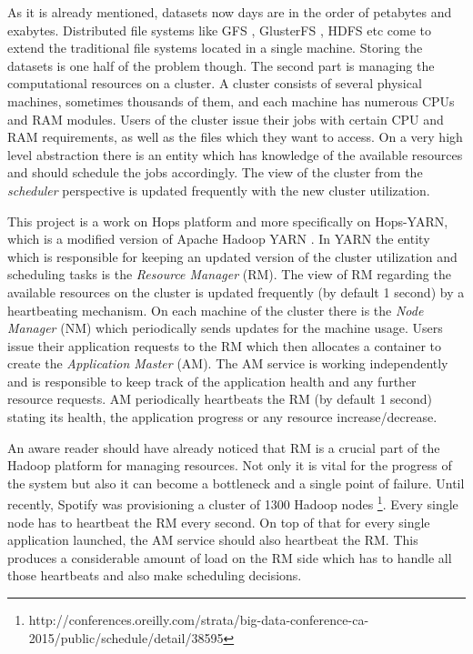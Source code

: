 As it is already mentioned, datasets now days are in the order of
petabytes and exabytes. Distributed file systems like GFS
\cite{Ghemawat:2003:GFS:1165389.945450}, 
GlusterFS \cite{glusterfs}, HDFS \cite{Shvachko:2010:HDF:1913798.1914427} etc come to extend
the traditional file systems located in a single machine. Storing the
datasets is one half of the problem though. The second part is
managing the computational resources on a cluster. A cluster consists
of several physical machines, sometimes thousands of them, and each
machine has numerous CPUs and RAM modules. Users of the cluster issue
their jobs with certain CPU and RAM requirements, as well as the files
which they want to access. On a very high level abstraction there is
an entity which has knowledge of the available resources and should
schedule the jobs accordingly. The view of the cluster from the
\emph{scheduler} perspective is updated frequently with the new
cluster utilization.

This project is a work on Hops \cite{hops} platform
and more specifically on Hops-YARN, which is a modified version of
Apache Hadoop YARN \cite{Vavilapalli:2013:AHY:2523616.2523633}. In YARN the
entity which is responsible for keeping an updated version of the
cluster utilization and scheduling tasks is the \emph{Resource
Manager} (RM). The view of RM regarding the available resources on the
cluster is updated frequently (by default 1 second) by a heartbeating
mechanism. On each machine of the cluster there is the \emph{Node
Manager} (NM) which periodically sends updates for the machine
usage. Users issue their application requests to the RM which then
allocates a container to create the \emph{Application Master}
(AM). The AM service is working independently and is responsible to
keep track of the application health and any further resource
requests. AM periodically heartbeats the RM (by default 1 second)
stating its health, the application progress or any resource
increase/decrease.

An aware reader should have already noticed that RM is a crucial part
of the Hadoop platform for managing resources. Not only it is vital
for the progress of the system but also it can become a
bottleneck and a single point of failure. Until recently, Spotify was
provisioning a cluster of 1300
Hadoop nodes \footnote{http://conferences.oreilly.com/strata/big-data-conference-ca-2015/public/schedule/detail/38595}. Every single node has to heartbeat the RM every
second. On top of that for every single application launched, the AM
service should also heartbeat the RM. This produces a considerable
amount of load on the RM side which has to handle all those heartbeats
and also make scheduling decisions.

